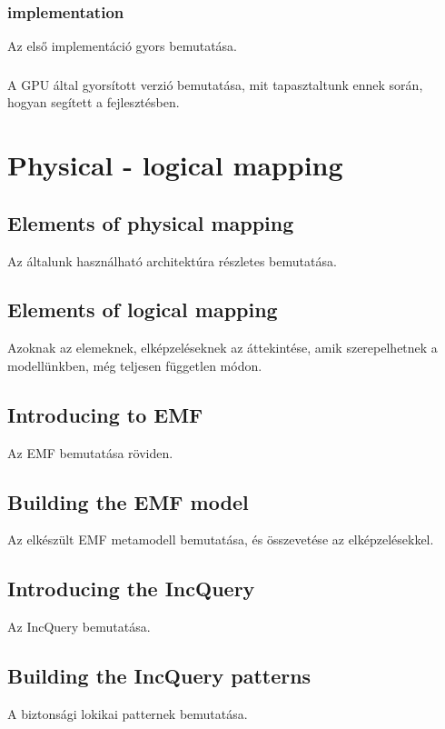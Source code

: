 \subsubsection{ implementation}
Az első implementáció gyors bemutatása.
\subsubsection{}
A GPU által gyorsított verzió bemutatása, mit tapasztaltunk ennek során, hogyan segített a fejlesztésben.

\section{Physical - logical mapping}
	\subsection{Elements of physical mapping}
		Az általunk használható architektúra részletes bemutatása.
	\subsection{Elements of logical mapping}
		Azoknak az elemeknek, elképzeléseknek az áttekintése, amik szerepelhetnek a modellünkben, még teljesen független módon.
	\subsection{Introducing to EMF}
		Az EMF bemutatása röviden.
	\subsection{Building the EMF model}
		Az elkészült EMF metamodell bemutatása, és összevetése az elképzelésekkel.
	\subsection{Introducing the IncQuery}
		Az IncQuery bemutatása.
	\subsection{Building the IncQuery patterns}
		A biztonsági lokikai patternek bemutatása.